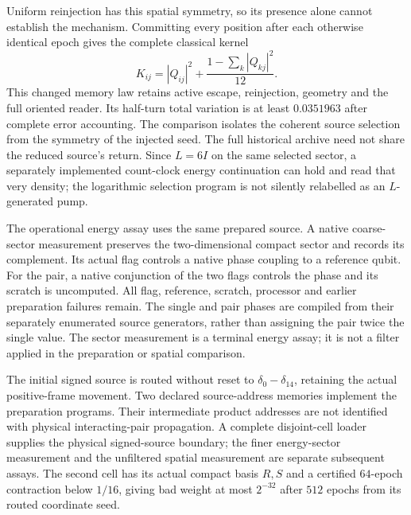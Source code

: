 Uniform reinjection has this spatial symmetry, so its presence
alone cannot establish the mechanism. Committing every position after
each otherwise identical epoch gives the complete classical kernel
\[
 K_{ij}=|Q_{ij}|^2+
 \frac{1-\sum_k|Q_{kj}|^2}{12}.
\]
This changed memory law retains active escape, reinjection, geometry
and the full oriented reader. Its half-turn total variation is at least
$0.0351963$ after complete error accounting. The comparison isolates
the coherent source selection from the symmetry of the injected seed.
The full historical archive need not share the reduced source's return.
Since $L=6I$ on the same selected sector, a separately implemented
count-clock energy continuation can hold and read that very density;
the logarithmic selection program is not silently relabelled as an
$L$-generated pump.

The operational energy assay uses the same prepared source. A native
coarse-sector measurement preserves the two-dimensional compact sector
and records its complement. Its actual flag controls a native phase
coupling to a reference qubit. For the pair, a native conjunction of
the two flags controls the phase and its scratch is uncomputed. All
flag, reference, scratch, processor and earlier preparation failures
remain. The single and pair phases are compiled from their separately
enumerated source generators, rather than assigning the pair twice
the single value. The sector measurement is a terminal energy assay;
it is not a filter applied in the preparation or spatial comparison.

The initial signed source is routed without reset to
$\delta_0-\delta_{14}$, retaining the actual positive-frame movement.
Two declared source-address memories implement the preparation programs.
Their intermediate product addresses are not identified with physical
interacting-pair propagation. A complete disjoint-cell loader supplies
the physical signed-source boundary; the finer energy-sector measurement
and the unfiltered spatial measurement are separate subsequent assays.
The second cell has its actual compact basis $R,S$ and a certified
$64$-epoch contraction below $1/16$, giving bad weight at most $2^{-32}$
after $512$ epochs from its routed coordinate seed.

